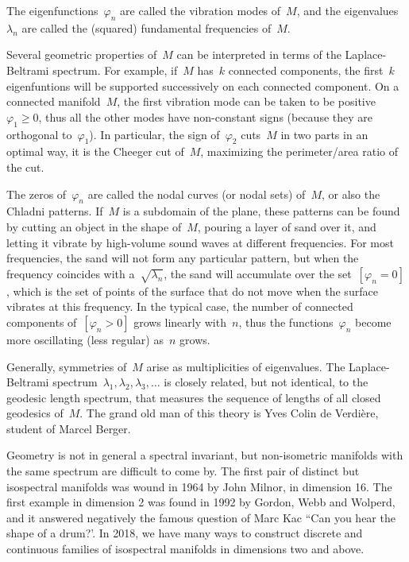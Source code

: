 The eigenfunctions~$\varphi_n$ are called the vibration modes of~$M$, and the
eigenvalues~$\lambda_n$ are called the (squared) fundamental frequencies of~$M$.

Several geometric properties of~$M$ can be interpreted in terms of the
Laplace-Beltrami spectrum.  For example, if~$M$ has~$k$ connected components,
the first~$k$ eigenfuntions will be supported successively on each connected
component.  On a connected manifold~$M$, the first vibration mode can be
taken to be positive~$\varphi_1\ge0$, thus all the other modes have
non-constant signs (because they are orthogonal to~$\varphi_1$).  In
particular, the sign of~$\varphi_2$ cuts~$M$ in two parts in an optimal way,
it is the Cheeger cut of~$M$, maximizing the perimeter/area ratio of the cut.

The zeros of~$\varphi_n$ are called the nodal curves (or nodal sets) of~$M$,
or also the Chladni patterns.  If~$M$ is a subdomain of the plane, these
patterns can be found by cutting an object in the shape of~$M$, pouring a
layer of sand over it, and letting it vibrate by high-volume sound waves at
different frequencies.  For most frequencies, the sand will not form any
particular pattern, but when the frequency coincides with
a~$\sqrt{\lambda_n}$, the sand will accumulate over the set~$[\varphi_n=0]$,
which is the set of points of the surface that do not move when the surface
vibrates at this frequency.  In the typical case, the number of connected
components of~$[\varphi_n>0]$ grows linearly with~$n$, thus the
functions~$\varphi_n$ become more oscillating (less regular) as~$n$ grows.

Generally, symmetries of~$M$ arise as multiplicities of eigenvalues.
The Laplace-Beltrami spectrum~${\lambda_1,\lambda_2,\lambda_3,\ldots}$ is
closely related, but not identical, to the geodesic length spectrum, that
measures the sequence of lengths of all closed geodesics of~$M$.  The grand
old man of this theory is Yves Colin de Verdière, student of Marcel Berger.

Geometry is not in general a spectral invariant, but non-isometric manifolds
with the same spectrum are difficult to come by.  The first pair of distinct
but isospectral manifolds was wound in 1964 by John Milnor, in dimension 16.
The first example in dimension 2 was found in 1992 by Gordon, Webb and
Wolperd, and it answered negatively the famous question of Marc Kac ``Can you
hear the shape of a drum?'.
In 2018, we have many ways to construct discrete and continuous families of
isospectral manifolds in dimensions two and above.



